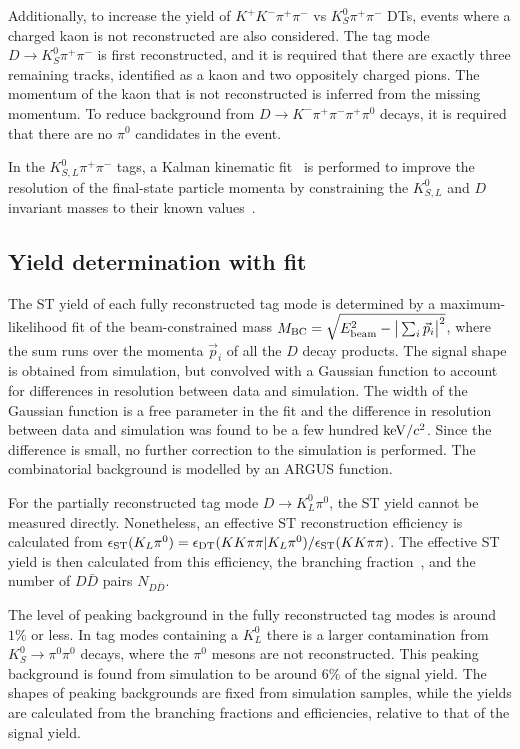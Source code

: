 \documentclass[12pt, a4paper, notitlepage, onecolumn]{article}
\begin{document}
Additionally, to increase the yield of $K^+K^-\pi^+\pi^-$ vs $K_S^0\pi^+\pi^-$ DTs, events where a charged kaon is not reconstructed are also considered. The tag mode $D\to K_S^0\pi^+\pi^-$ is first reconstructed, and it is required that there are exactly three remaining tracks, identified as a kaon and two oppositely charged pions. The momentum of the kaon that is not reconstructed is inferred from the missing momentum. To reduce background from $D\to K^-\pi^+\pi^-\pi^+\pi^0$ decays, it is required that there are no $\pi^0$ candidates in the event.

In the $K_{S, L}^0\pi^+\pi^-$ tags, a Kalman kinematic fit~\cite{KalmanFit_cite} is performed to improve the resolution of the final-state particle momenta by constraining the $K_{S, L}^0$ and $D$ invariant masses to their known values~\cite{pdg}.

\subsection{Yield determination with \texorpdfstring{}{MBC} fit}
\noindent The ST yield of each fully reconstructed tag mode is determined by a maximum-likelihood fit of the beam-constrained mass $M_{\rm BC} = \sqrt{E_{\rm beam}^2 - \big\lvert\sum_i\vec{p}_i\big\rvert^2}$, where the sum runs over the momenta $\vec{p}_i$ of all the $D$ decay products. The signal shape is obtained from simulation, but convolved with a Gaussian function to account for differences in resolution between data and simulation. The width of the Gaussian function is a free parameter in the fit and the difference in resolution between data and simulation was found to be a few hundred ${\rm keV}/c^2$. Since the difference is small, no further correction to the simulation is performed. The combinatorial background is modelled by an ARGUS function.

For the partially reconstructed tag mode $D\to K_L^0\pi^0$, the ST yield cannot be measured directly. Nonetheless, an effective ST reconstruction efficiency is calculated from $\epsilon_{\rm ST}(K_L\pi^0) = \epsilon_{\rm DT}(KK\pi\pi|K_L\pi^0)/\epsilon_{\rm ST}(KK\pi\pi)$. The effective ST yield is then calculated from this efficiency, the branching fraction~\cite{cite:deltaKpi}, and the number of $D\bar{D}$ pairs $N_{D\bar{D}}$.

The level of peaking background in the fully reconstructed tag modes is around $1\%$ or less. In tag modes containing a $K_L^0$ there is a larger contamination from $K_S^0\to\pi^0\pi^0$ decays, where the $\pi^0$ mesons are not reconstructed. This peaking background is found from simulation to be around $6\%$ of the signal yield. The shapes of peaking backgrounds are fixed from simulation samples, while the yields are calculated from the branching fractions and efficiencies, relative to that of the signal yield.
\end{document}
